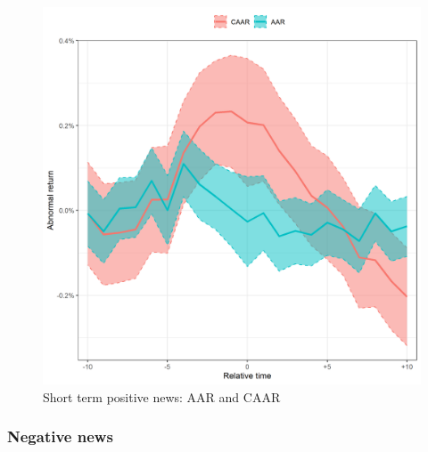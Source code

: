 \begin{figure} [H] \label{st_pos}
    \centering
    \includegraphics[scale=0.6]{Projekt/1.Figures analysis/ST_positive_all_CI.png}
    \caption{Short term positive news: AAR and CAAR}
    \label{fig:ST_pos_news}
\end{figure}


 \label{ST_tab}

\subsubsection{Negative news}

